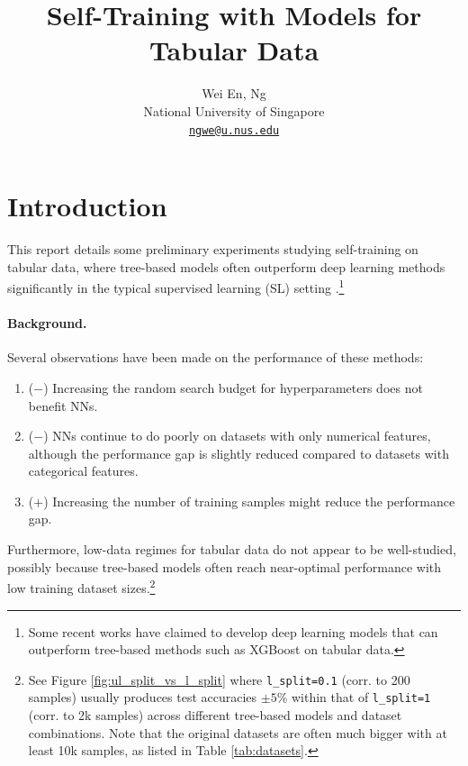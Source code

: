 \documentclass{article}
\title{Self-Training with Models for Tabular Data}
\author{
    Wei En, Ng \\
    National University of Singapore \\
    \texttt{\href{mailto:ngwe@u.nus.edu}{ngwe@u.nus.edu}}
}
\begin{document}
\maketitle

\tableofcontents

\section{Introduction}

This report details some preliminary experiments studying self-training
\cite{amini2023selftraining} on tabular data, where tree-based models often outperform
deep learning methods significantly in the typical supervised learning (SL) setting
\cite{shwartz-ziv2021tabular,grinsztajn2022why}.\footnote{%
  Some recent works \cite{gorishniy2023tabr} have claimed to develop deep learning
  models that can outperform tree-based methods such as XGBoost \cite{chen2016xgboost}
  on tabular data.
}

\paragraph{Background.}
Several observations have been made on the performance of these methods:
\begin{enumerate}
    \item ($\bm{-}$) Increasing the random search budget for hyperparameters does
    not benefit NNs. \cite{grinsztajn2022why}
    \item ($\bm{-}$) NNs continue to do poorly on datasets with only numerical
    features, although the performance gap is slightly reduced compared to datasets with
    categorical features. \cite{grinsztajn2022why}
    \item ($\bm{+}$) Increasing the number of training samples might reduce the
    performance gap. \cite{grinsztajn2022why}
\end{enumerate}

Furthermore, low-data regimes for tabular data do not appear to be well-studied,
possibly because tree-based models often reach near-optimal performance with low
training dataset sizes.\footnote{%
  See Figure \ref{fig:ul_split_vs_l_split} where \texttt{l\_split=0.1} (corr. to 200
  samples) usually produces test accuracies $\pm 5\%$ within that of \texttt{l\_split=1}
  (corr. to 2k samples) across different tree-based models and dataset combinations.
  Note that the original datasets are often much bigger with at least 10k samples, as
  listed in Table \ref{tab:datasets}.
}
\end{document}
